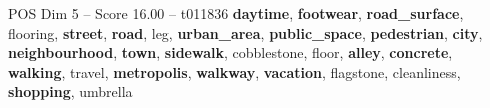\begin{textsample}{POS Dim 5 – Score 16.00 – t011836}  \label{ex:f5_pos_030}
\textbf{daytime}, \textbf{footwear}, \textbf{road\_surface}, flooring, \textbf{street}, \textbf{road}, leg, \textbf{urban\_area}, \textbf{public\_space}, \textbf{pedestrian}, \textbf{city}, \textbf{neighbourhood}, \textbf{town}, \textbf{sidewalk}, cobblestone, floor, \textbf{alley}, \textbf{concrete}, \textbf{walking}, travel, \textbf{metropolis}, \textbf{walkway}, \textbf{vacation}, flagstone, cleanliness, \textbf{shopping}, umbrella

\end{textsample}
